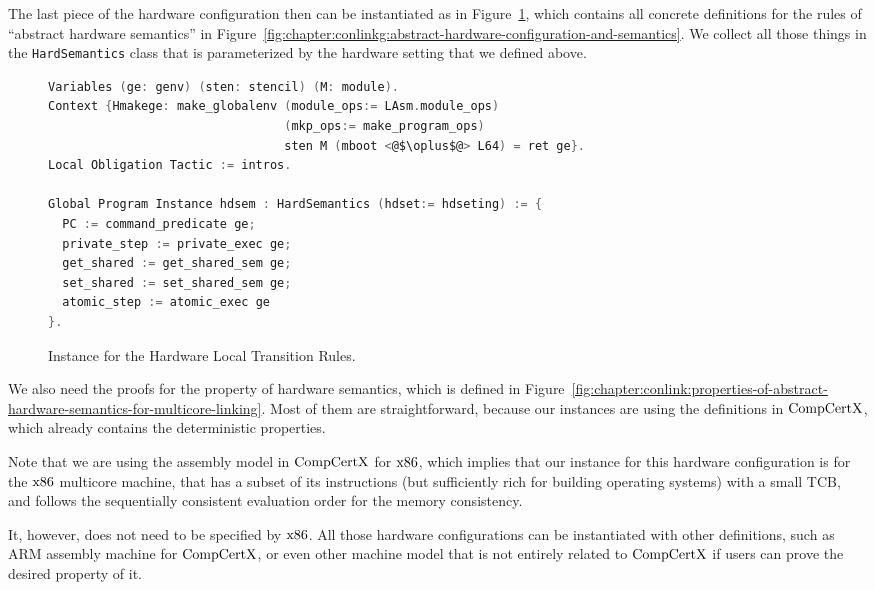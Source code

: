 The last piece of the hardware configuration then can be instantiated as in Figure~\ref{fig:chapter:certikos:hardware-local-step-transition-rules},
which contains all concrete definitions for the rules of ``abstract hardware semantics'' in  Figure~\ref{fig:chapter:conlinkg:abstract-hardware-configuration-and-semantics}.
We collect all those things in the \lstinline$HardSemantics$ class that is parameterized by the hardware setting that we defined above. 
\begin{figure}
\begin{lstlisting}[language=C]
Variables (ge: genv) (sten: stencil) (M: module).
Context {Hmakege: make_globalenv (module_ops:= LAsm.module_ops) 
                                 (mkp_ops:= make_program_ops) 
                                 sten M (mboot <@$\oplus$@> L64) = ret ge}.
Local Obligation Tactic := intros.

Global Program Instance hdsem : HardSemantics (hdset:= hdseting) := {
  PC := command_predicate ge;
  private_step := private_exec ge;
  get_shared := get_shared_sem ge;
  set_shared := set_shared_sem ge;
  atomic_step := atomic_exec ge 
}.
\end{lstlisting}
\caption{Instance for the Hardware Local Transition Rules.}
\label{fig:chapter:certikos:hardware-local-step-transition-rules}
\end{figure}
We also need the proofs for the property of hardware semantics, which is defined in Figure~\ref{fig:chapter:conlink:properties-of-abstract-hardware-semantics-for-multicore-linking}. 
Most of them are straightforward, because our instances are using the definitions in $\mathrm{CompCertX}$,
which already contains the deterministic properties. 

Note that we are using the assembly model in $\mathrm{CompCertX}$ for $\mathrm{x86}$, which implies that 
our instance for this hardware configuration is 
for the $\mathrm{x86}$ multicore machine,
that has a subset of its instructions (but sufficiently rich for building operating systems) with a small TCB, 
and follows the sequentially consistent evaluation order for the memory consistency. 

It, however, does not need to be specified by $\mathrm{x86}$. 
All  those hardware configurations can be instantiated with other definitions, such as ARM assembly machine for $\mathrm{CompCertX}$, 
or even other machine model that is not entirely related to $\mathrm{CompCertX}$ if users can prove the desired property of it. 
